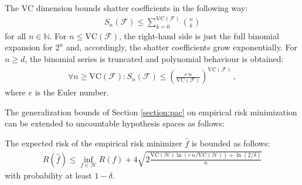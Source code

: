     \begin{property}\label{data:sauer_lemma}
        The VC dimension bounds shatter coefficients in the following way:
        \begin{gather}
            S_n(\mathcal{F})\leq\sum_{k=0}^{\mathrm{VC}(\mathcal{F})}\binom{n}{k}
        \end{gather}
        for all $n\in\mathbb{N}$. For $n\leq\mathrm{VC}(\mathcal{F})$, the right-hand side is just the full binomial expansion for $2^n$ and, accordingly, the shatter coefficients grow exponentially. For $n\geq d$, the binomial series is truncated and polynomial behaviour is obtained:
        \begin{gather}
            \forall n\geq\mathrm{VC}(\mathcal{F}):S_n(\mathcal{F})\leq\left(\frac{e\,n}{\mathrm{VC}(\mathcal{F})}\right)^{\mathrm{VC}(\mathcal{F})}\,,
        \end{gather}
        where $e$ is the Euler number.
    \end{property}

    The generalization bounds of Section \ref{section:pac} on empirical risk minimization can be extended to uncountable hypothesis spaces as follows:
    \begin{property}
        The expected risk of the empirical risk minimizer $\hat{f}$ is bounded as follows:
        \begin{gather}
            R(\hat{f})\leq\inf_{f\in\mathcal{H}}R(f)+4\sqrt{2\frac{\mathrm{VC}(\mathcal{H})\ln(e\,n/\mathrm{VC}(\mathcal{H})) + \ln(2/\delta)}{n}}
        \end{gather}
        with probability at least $1-\delta$.
    \end{property}

